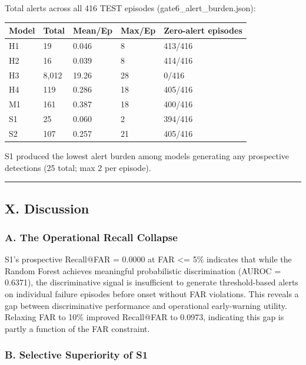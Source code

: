 \documentclass[
]{article}
\newcounter{none} %
\begin{document}
Total alerts across all 416 TEST episodes (gate6\_alert\_burden.json):

{\def\LTcaptype{none} %
\begin{longtable}[]{@{}lllll@{}}
\toprule\noalign{}
Model & Total & Mean/Ep & Max/Ep & Zero-alert episodes \\
\midrule\noalign{}
\endhead
\bottomrule\noalign{}
\endlastfoot
H1 & 19 & 0.046 & 8 & 413/416 \\
H2 & 16 & 0.039 & 8 & 414/416 \\
H3 & 8,012 & 19.26 & 28 & 0/416 \\
H4 & 119 & 0.286 & 18 & 405/416 \\
M1 & 161 & 0.387 & 18 & 400/416 \\
S1 & 25 & 0.060 & 2 & 394/416 \\
S2 & 107 & 0.257 & 21 & 405/416 \\
\end{longtable}
}

S1 produced the lowest alert burden among models generating any
prospective detections (25 total; max 2 per episode).

\begin{center}\rule{0.5\linewidth}{0.5pt}\end{center}

\subsection{X. Discussion}\label{x.-discussion}

\subsubsection{A. The Operational Recall
Collapse}\label{a.-the-operational-recall-collapse}

S1's prospective Recall@FAR = 0.0000 at FAR \textless= 5\% indicates
that while the Random Forest achieves meaningful probabilistic
discrimination (AUROC = 0.6371), the discriminative signal is
insufficient to generate threshold-based alerts on individual failure
episodes before onset without FAR violations. This reveals a gap between
discriminative performance and operational early-warning utility.
Relaxing FAR to 10\% improved Recall@FAR to 0.0973, indicating this gap
is partly a function of the FAR constraint.

\subsubsection{B. Selective Superiority of
S1}\label{b.-selective-superiority-of-s1}
\end{document}
